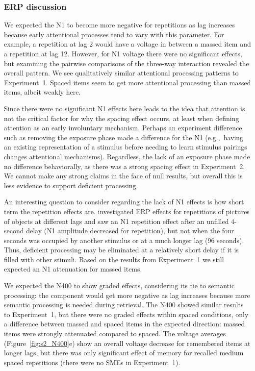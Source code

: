 \subsubsection{ERP discussion}

We expected the N1 to become more negative for repetitions as lag increases because early attentional processes tend to vary with this parameter.  For example, a repetition at lag 2 would have a voltage in between a massed item and a repetition at lag 12.  However, for N1 voltage there were no significant effects, but examining the pairwise comparisons of the three-way interaction revealed the overall pattern.  We see qualitatively similar attentional processing patterns to Experiment~1.  Spaced items seem to get more attentional processing than massed items, albeit weakly here.

Since there were no significant N1 effects here leads to the idea that attention is not the critical factor for why the spacing effect occurs, at least when defining attention as an early involuntary mechanism.  Perhaps an experiment difference such as removing the exposure phase made a difference for the N1 (e.g.,~having an existing representation of a stimulus before needing to learn stimulus pairings changes attentional mechanisms).  Regardless, the lack of an exposure phase made no difference behaviorally, as there was a strong spacing effect in Experiment~2.  We cannot make any strong claims in the face of null results, but overall this is less evidence to support deficient processing.

An interesting question to consider regarding the lack of N1 effects is how short term the repetition effects are.   investigated ERP effects for repetitions of pictures of objects at different lags and saw an N1 repetition effect after an unfilled 4-second delay (N1 amplitude decreased for repetition), but not when the four seconds was occupied by another stimulus or at a much longer lag (96 seconds).  Thus, deficient processing may be eliminated at a relatively short delay if it is filled with other stimuli.  Based on the results from Experiment~1 we still expected an N1 attenuation for massed items.


We expected the N400 to show graded effects, considering its tie to  semantic processing: the component would get more negative as lag increases because more semantic processing is needed during retrieval.  The N400 showed similar results to Experiment~1, but there were no graded effects within spaced conditions, only a difference between massed and spaced items in the expected direction: massed items were strongly attenuated compared to spaced.  The voltage averages (Figure~\ref{fig:s2_N400}e) show an overall voltage decrease for remembered items at longer lags, but there was only significant effect of memory for recalled medium spaced repetitions (there were no SMEs in Experiment~1).

